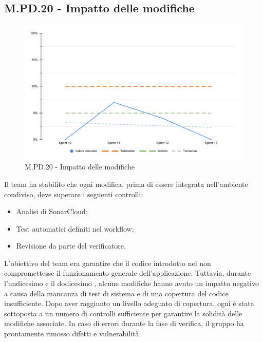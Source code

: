 \subsection{M.PD.20 - Impatto delle modifiche}

\begin{figure}[H]
  \centering
  \includegraphics[width=\textwidth]{assets/impatto_modifiche.pdf}
  \caption{M.PD.20 - Impatto delle modifiche}
\end{figure}

\par Il team ha stabilito che ogni modifica, prima di essere integrata nell'ambiente condiviso, deve superare i seguenti controlli:
\begin{itemize}
  \item Analisi di SonarCloud;
  \item Test automatici definiti nel workflow;
  \item Revisione da parte del verificatore.
\end{itemize}

\vspace{0.5\baselineskip}
\par L'obiettivo del team era garantire che il codice introdotto nel  non compromettesse il funzionamento generale dell'applicazione. Tuttavia, durante l'undicesimo e il dodicesimo , alcune modifiche hanno avuto un impatto negativo a causa della mancanza di test di sistema e di una copertura del codice insufficiente. Dopo aver raggiunto un livello adeguato di copertura, ogni  è stata sottoposta a un numero di controlli sufficiente per garantire la solidità delle modifiche associate. In caso di errori durante la fase di verifica, il gruppo ha prontamente rimosso difetti e vulnerabilità.